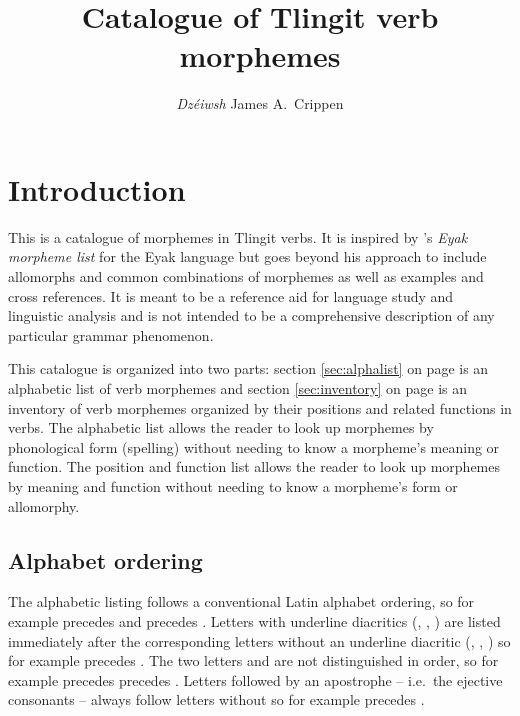 \documentclass[12pt,letterpaper,oneside,article]{memoir}
\begin{document}
\title{Catalogue of Tlingit verb morphemes}
\author{\textit{Dzéiwsh} James A.\ Crippen}

\maketitle
\tableofcontents*

\clearpage
\section{Introduction}\label{sec:intro}

This is a catalogue of morphemes in Tlingit verbs.
It is inspired by \citeauthor{krauss:1981a}’s \textit{Eyak morpheme list} \parencite{krauss:1981a} for the Eyak language but goes beyond his approach to include allomorphs and common combinations of morphemes as well as examples and cross references.
It is meant to be a reference aid for language study and linguistic analysis and is not intended to be a comprehensive description of any particular grammar phenomenon.

This catalogue is organized into two parts:
section \ref{sec:alphalist} on page \pageref{sec:alphalist} is an alphabetic list of verb morphemes
and section \ref{sec:inventory} on page \pageref{sec:inventory} is an inventory of verb morphemes organized by their positions and related functions in verbs.
The alphabetic list allows the reader to look up morphemes by phonological form (spelling) without needing to know a morpheme’s meaning or function.
The position and function list allows the reader to look up morphemes by meaning and function without needing to know a morpheme’s form or allomorphy.

\subsection{Alphabet ordering}\label{sec:intro-alpha}

The alphabetic listing follows a conventional Latin alphabet ordering, so for example  precedes  and  precedes .
Letters with underline diacritics (, , ) are listed immediately after the corresponding letters without an underline diacritic (, , ) so for example  precedes .
The two letters  and  are not distinguished in order, so for example  precedes  precedes .
Letters followed by an apostrophe – i.e.\ the ejective consonants – always follow letters without so for example  precedes .
\end{document}
